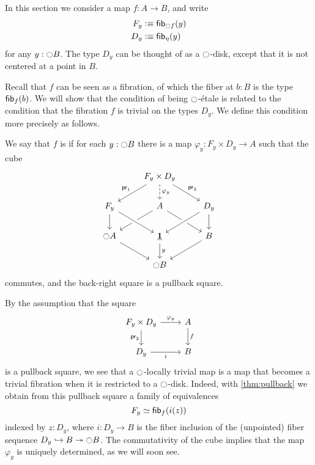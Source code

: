 \documentclass[9pt,twosided]{amsart}
\begin{document}
  In this section we consider a map $f:A\to B$, and write
  \begin{align*}
    F_y & \defeq \fib{\modal f}{y} \\
    D_y & \defeq \fib{\eta}{y}
  \end{align*}
  for any $y:{\ocircle} B$. The type $D_y$ can be thought of as a ${\ocircle}$-disk, except that it is not centered at a point in $B$.

  Recall that $f$ can be seen as a fibration, of which the fiber at $b:B$ is the type $\fib{f}{b}$. We will show that the condition of being ${\ocircle}$-\'etale is related to the condition that the fibration $f$ is trivial on the types $D_y$. We define this condition more precisely as follows.
  
\begin{defn}
 We say that $f$ is  if for each $y:{\ocircle} B$ there is a map $\varphi_y:F_y\times D_y \to A$ such that the cube
  \begin{equation*}
    \begin{tikzcd}
      & F_y\times D_y \arrow[dl,swap,"\proj 1"] \arrow[d,dashed,"\varphi_y"] \arrow[dr,"\proj 2"] \\
      F_y \arrow[d] & A \arrow[dl] \arrow[dr] & D_y \arrow[d] \arrow[dl,crossing over] \\
      \modal A \arrow[dr] & \unit \arrow[from=ul,crossing over] \arrow[d,"y"] & B \arrow[dl] \\
      & \modal B
    \end{tikzcd}
  \end{equation*}
  commutes, and the back-right square is a pullback square.
\end{defn}

By the assumption that the square
\begin{equation*}
  \begin{tikzcd}
    F_y\times D_y \arrow[d,swap,"\proj 2"] \arrow[r,"\varphi_y"] & A \arrow[d,"f"] \\
    D_y \arrow[r,swap,"i"] & B
  \end{tikzcd}
\end{equation*}
is a pullback square, we see that a ${\ocircle}$-locally trivial map is a map that becomes a trivial fibration when it is restricted to a ${\ocircle}$-disk. Indeed, with \cref{thm:pullback} we obtain from this pullback square a family of equivalences
\begin{equation*}
  F_y \simeq \fib{f}{i(z)}
\end{equation*}
indexed by $z:D_y$, where $i:D_y\to B$ is the fiber inclusion of the (unpointed) fiber sequence $D_y\hookrightarrow B\twoheadrightarrow{\ensuremath{\ocircle}} B$. The commutativity of the cube implies that the map $\varphi_y$ is uniquely determined, as we will soon see.
\end{document}
